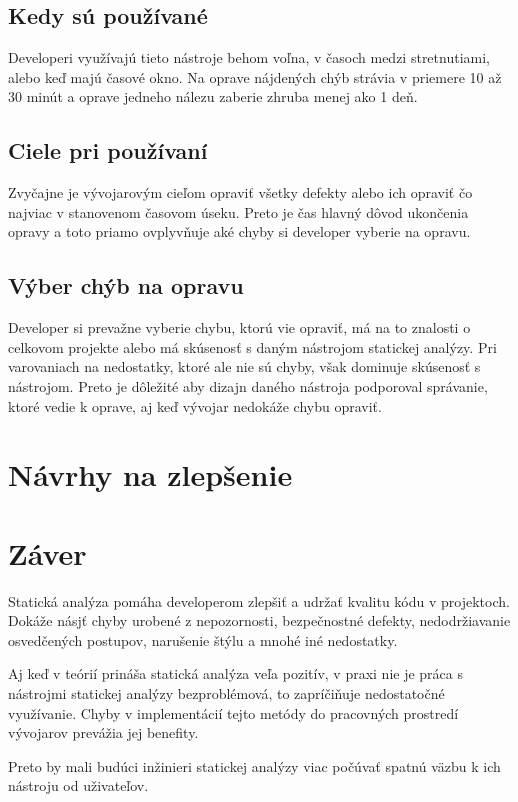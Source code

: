 \documentclass[11pt,twoside,slovak,a4paper]{article}
\begin{document}
\subsection*{Kedy sú používané}
Developeri využívajú tieto nástroje behom voľna, v časoch medzi stretnutiami, alebo keď majú časové okno. Na oprave
nájdených chýb strávia v priemere 10 až 30 minút a oprave jedneho nálezu zaberie zhruba menej ako 1 deň.

\subsection*{Ciele pri používaní}
Zvyčajne je vývojarovým cieľom opraviť všetky defekty alebo ich opraviť čo najviac v stanovenom časovom úseku. Preto
je čas hlavný dôvod ukončenia opravy a toto priamo ovplyvňuje aké chyby si developer vyberie na opravu.

\subsection*{Výber chýb na opravu}
Developer si prevažne vyberie chybu, ktorú vie opraviť, má na to znalosti o celkovom projekte alebo má skúsenosť s
daným nástrojom statickej analýzy. Pri varovaniach na nedostatky, ktoré ale nie sú chyby, však dominuje skúsenosť
s nástrojom. Preto je dôležité aby dizajn daného nástroja podporoval správanie, ktoré vedie k oprave, aj keď vývojar
nedokáže chybu opraviť.

\section{Návrhy na zlepšenie} \label{navrhy}

\section{Záver}
Statická analýza pomáha developerom zlepšiť a udržať kvalitu kódu v projektoch. Dokáže násjť chyby urobené z
nepozornosti, bezpečnostné defekty, nedodržiavanie osvedčených postupov, narušenie štýlu a mnohé iné nedostatky.

Aj keď v teórií prináša statická analýza veľa pozitív, v praxi nie je práca s nástrojmi statickej analýzy
bezproblémová, to zapríčiňuje nedostatočné využívanie. Chyby v implementácií tejto metódy do pracovných prostredí
vývojarov prevážia jej benefity.

Preto by mali budúci inžinieri statickej analýzy viac počúvať spatnú väzbu k ich nástroju od uživateľov.

\pagebreak


\end{document}
